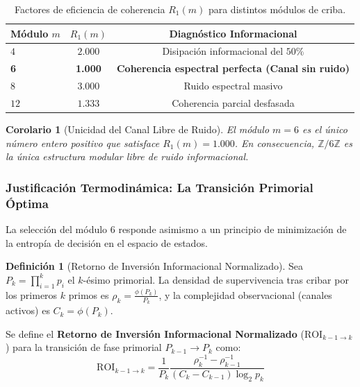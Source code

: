 \documentclass{article}
\numberwithin{equation}{section}
\theoremstyle{plain}
\newtheorem{corollary}[theorem]{Corolario}
\theoremstyle{definition}
\newtheorem{definition}[theorem]{Definición}
\begin{document}
\begin{table}[htbp]
\centering
\caption{Factores de eficiencia de coherencia $R_1(m)$ para distintos módulos de criba.}
\label{tab:R1}
\begin{tabular}{lcc}
\toprule
\textbf{Módulo $m$} & $R_1(m)$ & \textbf{Diagnóstico Informacional} \\
\midrule
$4$  & $2.000$ & Disipación informacional del $50\%$ \\
\textbf{6}  & \textbf{1.000} & \textbf{Coherencia espectral perfecta (Canal sin ruido)} \\
$8$  & $3.000$ & Ruido espectral masivo \\
$12$ & $1.333$ & Coherencia parcial desfasada \\
\bottomrule
\end{tabular}
\end{table}

\begin{corollary}[Unicidad del Canal Libre de Ruido]
\label{cor:unicidad-R1}
El módulo $m = 6$ es el único número entero positivo que satisface $R_1(m) = 1.000$. En consecuencia, $\mathbb{Z}/6\mathbb{Z}$ es la única estructura modular libre de ruido informacional.
\end{corollary}

\subsubsection{Justificación Termodinámica: La Transición Primorial Óptima}

La selección del módulo 6 responde asimismo a un principio de minimización de la entropía de decisión en el espacio de estados.

\begin{definition}[Retorno de Inversión Informacional Normalizado]
\label{def:roi}
Sea $P_k = \prod_{i=1}^{k} p_i$ el $k$-ésimo primorial. La densidad de supervivencia tras cribar por los primeros $k$ primos es $\rho_k = \frac{\phi(P_k)}{P_k}$, y la complejidad observacional (canales activos) es $C_k = \phi(P_k)$.

Se define el \textbf{Retorno de Inversión Informacional Normalizado} ($\mathrm{ROI}_{k-1 \to k}$) para la transición de fase primorial $P_{k-1} \to P_k$ como:
\begin{equation}
\mathrm{ROI}_{k-1 \to k} = \frac{1}{P_k} \frac{\rho_k^{-1} - \rho_{k-1}^{-1}}{(C_k - C_{k-1}) \log_2 p_k}
\end{equation}
\end{definition}
\end{document}
